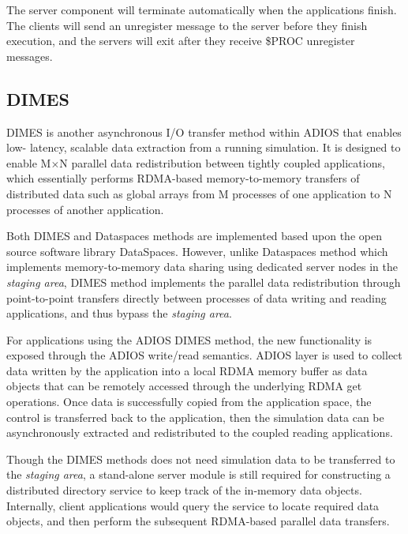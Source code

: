 The server component will terminate automatically when the applications finish. 
The clients  will send an unregister message to the server before 
they finish execution, and the servers will exit after they receive \$PROC unregister 
messages.


\subsection{DIMES}
\label{section-method-dimes}
DIMES is another asynchronous I/O transfer method within ADIOS that enables low-
latency, scalable data extraction from a running simulation. It is designed to enable M$
\times$N parallel data redistribution between tightly coupled applications, which 
essentially performs RDMA-based memory-to-memory transfers of distributed data such 
as global arrays from M processes of one application to N processes of another application.

Both DIMES and Dataspaces methods are implemented based upon the open source 
software library DataSpaces. However, unlike Dataspaces method which implements 
memory-to-memory data sharing using dedicated server nodes in the \emph{staging 
area}, DIMES method implements the parallel data redistribution through point-to-point 
transfers directly between processes of data writing and reading applications, and thus 
bypass the \emph{staging area}. 

For applications using the ADIOS DIMES method, the new functionality is exposed 
through the ADIOS write/read semantics. ADIOS layer is used to collect data written by 
the application into a local RDMA memory buffer as data objects that can 
be remotely accessed through the underlying RDMA get operations. Once data is 
successfully copied from the application space, the control is transferred back to the 
application, then the simulation data can be asynchronously extracted and redistributed 
to the coupled reading applications. 

Though the DIMES methods does not need simulation data to be transferred to the 
\emph{staging area}, a stand-alone server module is still required for constructing a 
distributed directory service to keep track of the in-memory data objects. Internally, client 
applications would query the service to locate required data objects, and then perform 
the subsequent RDMA-based parallel data transfers. 

